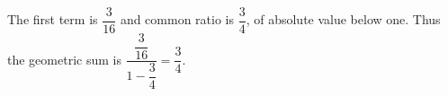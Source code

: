 The first term is $\dfrac{3}{16}$ and common ratio is $\dfrac{3}{4}$, of absolute value below one. Thus the geometric sum is $\dfrac{\dfrac{3}{16}}{1-\dfrac{3}{4}}=\boxed{\dfrac{3}{4}}$.
